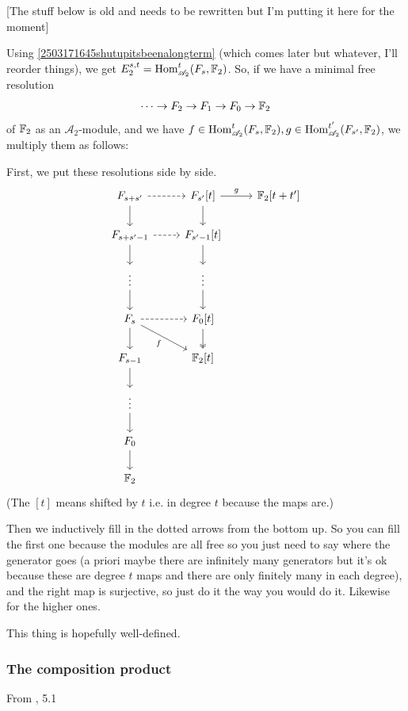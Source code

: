 \documentclass{MetricNotes2023}
\def\bb{\ensuremath\mathbb}
\def\A{\ensuremath{\mathscr{A}_2}}
\DeclareMathOperator{\Hom}{Hom}
\begin{document}
[The stuff below is old and needs to be rewritten but I'm putting it here for the moment]

Using \ref{2503171645shutupitsbeenalongterm} (which comes later but whatever, I'll reorder things), we get \(E_2^{s,t}=\Hom^t_{\A}(F_s, \bb{F}_2)\). So, if we have a minimal free resolution 
\[\cdots \to F_2 \to F_1 \to F_0 \to \bb{F}_2\]
of \(\bb{F}_2\) as an \(\A\)-module, and we have \(f \in \Hom^t_{\A}(F_s, \bb{F}_2), g \in \Hom^{t'}_{\A}(F_{s'}, \bb{F}_2)\), we multiply them as follows:

First, we put these resolutions side by side.
\[\begin{tikzcd}
F_{s+s'} \arrow[r, dashrightarrow,""] \arrow[d, swap, ""]  & F_{s'}[t]  \arrow[d, ""] \arrow[r, "g"] & \bb{F}_2[t+t']  \\
F_{s+s'-1} \arrow[r, dashrightarrow, ""] \arrow[d, ""] & F_{s'-1}[t] \arrow[d, ""] & \\
\vdots \arrow[d, ""] & \vdots \arrow[d, ""] &   \\
F_s \arrow[r, dashrightarrow, ""] \arrow[d, ""] \arrow[rd, "f"'] & F_0[t]  \arrow[d, twoheadrightarrow, ""] &   \\ 
F_{s-1} \arrow[d] & \bb{F}_2[t] & \\
\vdots \arrow[d] & & \\
F_0  \arrow[d] & & \\
\bb{F}_2 & & 
\end{tikzcd}\]
(The \([t]\) means shifted by \(t\) i.e. in degree \(t\) because the maps are.)

Then we inductively fill in the dotted arrows from the bottom up. So you can fill the first one because the modules are all free so you just need to say where the generator goes (a priori maybe there are infinitely many generators but it's ok because these are degree \(t\) maps and there are only finitely many in each degree), and the right map is surjective, so just do it the way you would do it. Likewise for the higher ones. 

This thing is hopefully well-defined.

\subsubsection{The composition product}

From \autocite{ass}, 5.1
\end{document}
